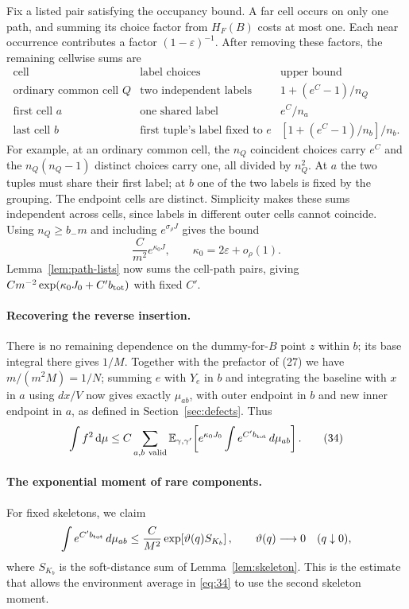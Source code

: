 Fix a listed pair satisfying the occupancy bound. A far cell occurs on
only one path, and summing its choice factor from $H_F(B)$ costs at
most one. Each near occurrence contributes a factor
$(1-\varepsilon)^{-1}$. After removing these factors, the remaining
cellwise sums are
\[
\begin{array}{c|c|c}
 \text{cell}&\text{label choices}&\text{upper bound}\\ \hline
 \text{ordinary common cell }Q&\text{two independent labels}
       &1+(e^C-1)/n_Q\\
 \text{first cell }a&\text{one shared label}&e^C/n_a\\
 \text{last cell }b&\text{first tuple's label fixed to }e
       &[1+(e^C-1)/n_b]/n_b.
\end{array}
\]
For example, at an ordinary common cell, the $n_Q$ coincident choices
carry $e^C$ and the $n_Q(n_Q-1)$ distinct choices carry one, all divided
by $n_Q^2$. At $a$ the two tuples must share their first label; at $b$
one of the two labels is fixed by the grouping. The endpoint cells are
distinct. Simplicity makes these sums independent across cells, since
labels in different outer cells cannot coincide. Using $n_Q\ge b_-m$
and including $e^{\sigma_\rho J}$ gives the bound
\[
                           \frac{C}{m^2}e^{\kappa_0 J},
                       \qquad \kappa_0=2\varepsilon+o_\rho(1).
\]
Lemma~\ref{lem:path-lists} now sums the cell-path pairs, giving
$C m^{-2}\exp(\kappa_0J_0+C'b_{\rm tot})$ with fixed $C'$.

\paragraph{Recovering the reverse insertion.}
There is no remaining dependence on the dummy-for-\(B\) point \(z\) within \(b\); its base integral there gives \(1/M\). Together with the prefactor of (27) we have \(m/(m^2 M)=1/N\); summing \(e\) with \(Y_e\) in \(b\) and integrating the baseline with \(x\) in \(a\) using \(dx/V\) now gives exactly $\mu_{ab}$, with outer endpoint in $b$ and new
inner endpoint in $a$, as defined in Section~\ref{sec:defects}. Thus
\[
                 \int f^2\,\mathrm d\mu
         \le C\sum_{a,b\ {\rm valid}} \mathbb E_{\gamma,\gamma'}\!
               \left[e^{\kappa_0 J_0}
                   \int e^{C' b_{\rm tot}}\,d\mu_{ab}\right].         \tag{34}\label{eq:34}
\]

\paragraph{The exponential moment of rare components.}
For fixed skeletons, we claim
\[
 \int e^{C'b_{\rm tot}}\,d\mu_{ab}
 \le \frac C{M^2}\exp\!\left[\vartheta(q)S_{K_b}\right],
 \qquad \vartheta(q)\longrightarrow0\quad(q\downarrow0),
\]
where $S_{K_b}$ is the soft-distance sum of Lemma~\ref{lem:skeleton}.
This is the estimate that allows the environment average in
\eqref{eq:34} to use the second skeleton moment.

